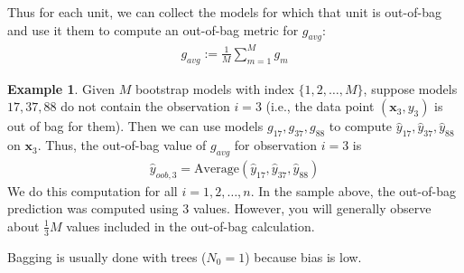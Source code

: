\documentclass[12pt, a4paper]{article}
\theoremstyle{definition}
\newtheorem*{example}{Example}
\begin{document}
	Thus for each unit,
	we can collect the models for which that unit is out-of-bag and use
	it them to compute an out-of-bag metric for $g_{avg}$:
	\begin{align*}
		g_{avg} := \frac{1}{M} \sum_{m=1}^{M}g_m
	\end{align*}
	\begin{tcolorbox}
		\begin{example}
			Given $M$ bootstrap models with index $\{1,2,\ldots,M\}$,
			suppose models $17, 37,88$ do not contain the observation
			$i=3$ (i.e., the data point $(\bm{x}_3,y_3)$ is out of bag
			for them). Then we can use models $g_{17}, g_{37}, g_{88}$
			to compute $\hat{y}_{17},\hat{y}_{37}, \hat{y}_{88}$ on
			$\bm{x}_3$. Thus, the out-of-bag value of $g_{avg}$ for
			observation $i=3$ is
			\begin{align*}
				\hat{y}_{oob, 3} = \text{Average}(\hat{y}_{17}, \hat{y}_{37}, \hat{y}_{88})
			\end{align*}
			We do this computation for all $i=1,2,\ldots,n$. In the sample
			above, the out-of-bag prediction was computed using 3 values.
			However, you will generally observe about $\frac{1}{3}M$ values
			included in the out-of-bag calculation.
		\end{example}
	\end{tcolorbox}
	Bagging is usually done with trees ($N_0 = 1$) because bias is low.
\end{document}
